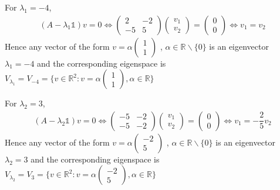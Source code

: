 \documentclass[a4paper,12pt,titlepage]{article}
\begin{document}
For $\lambda_1=-4$,
\begin{align*}
(A-\lambda_1\mathds{1})v=0\Leftrightarrow\begin{pmatrix}
2&-2\\-5&5\end{pmatrix}\begin{pmatrix}
v_1\\v_2\end{pmatrix}=\begin{pmatrix}
0\\0\end{pmatrix}\Leftrightarrow v_1=v_2
\end{align*}
Hence any vector of the form $v = \alpha\begin{pmatrix}
1\\1\end{pmatrix}$
, $\alpha \in \mathbb{R} \backslash \lbrace0\rbrace$ is an eigenvector $\lambda_1 = -4$ and the corresponding eigenspace is
$V_{\lambda_1}=V_{-4}=\lbrace v\in\mathbb{R}^2:v=\alpha\begin{pmatrix}
1\\1\end{pmatrix} ,\alpha \in \mathbb{R} \rbrace$

For $\lambda_2=3$,
\begin{align*}
(A-\lambda_2\mathds{1})v=0\Leftrightarrow\begin{pmatrix}
-5&-2\\-5&-2\end{pmatrix}\begin{pmatrix}
v_1\\v_2\end{pmatrix}=\begin{pmatrix}
0\\0\end{pmatrix}\Leftrightarrow v_1=-\dfrac{2}{5}v_2
\end{align*}
Hence any vector of the form $v = \alpha\begin{pmatrix}
-2\\5\end{pmatrix}$
, $\alpha \in \mathbb{R} \backslash \lbrace0\rbrace$ is an eigenvector $\lambda_2 = 3$ and the corresponding eigenspace is
$V_{\lambda_2}=V_{3}=\lbrace v\in\mathbb{R}^2:v=\alpha\begin{pmatrix}
-2\\5\end{pmatrix} ,\alpha \in \mathbb{R} \rbrace$
\end{document}

